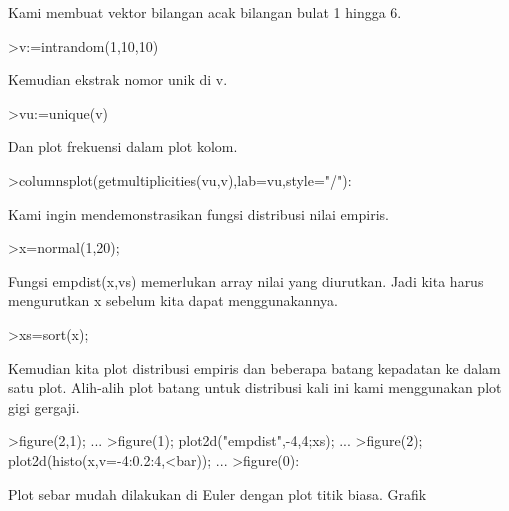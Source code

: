 \documentclass[a4paper,10pt]{article}
\begin{document}
\begin{eulernotebook}
\begin{eulercomment}
\begin{eulercomment}
\begin{eulercomment}
Kami membuat vektor bilangan acak bilangan bulat 1 hingga 6.
\end{eulercomment}
\begin{eulerprompt}
>v:=intrandom(1,10,10)
\end{eulerprompt}
\begin{euleroutput}
  [3,  2,  6,  10,  4,  1,  5,  3,  6,  7]
\end{euleroutput}
\begin{eulercomment}
Kemudian ekstrak nomor unik di v.
\end{eulercomment}
\begin{eulerprompt}
>vu:=unique(v)
\end{eulerprompt}
\begin{euleroutput}
  [1,  2,  3,  4,  5,  6,  7,  10]
\end{euleroutput}
\begin{eulercomment}
Dan plot frekuensi dalam plot kolom.
\end{eulercomment}
\begin{eulerprompt}
>columnsplot(getmultiplicities(vu,v),lab=vu,style="/"):
\end{eulerprompt}
\begin{eulercomment}
Kami ingin mendemonstrasikan fungsi distribusi nilai empiris.
\end{eulercomment}
\begin{eulerprompt}
>x=normal(1,20);
\end{eulerprompt}
\begin{eulercomment}
Fungsi empdist(x,vs) memerlukan array nilai yang diurutkan. Jadi kita
harus mengurutkan x sebelum kita dapat menggunakannya.
\end{eulercomment}
\begin{eulerprompt}
>xs=sort(x);
\end{eulerprompt}
\begin{eulercomment}
Kemudian kita plot distribusi empiris dan beberapa batang kepadatan ke
dalam satu plot. Alih-alih plot batang untuk distribusi kali ini kami
menggunakan plot gigi gergaji.
\end{eulercomment}
\begin{eulerprompt}
>figure(2,1); ...
>figure(1); plot2d("empdist",-4,4;xs); ...
>figure(2); plot2d(histo(x,v=-4:0.2:4,<bar));  ...
>figure(0):
\end{eulerprompt}
\begin{eulercomment}
Plot sebar mudah dilakukan di Euler dengan plot titik biasa. Grafik

\end{eulercomment}
\end{eulercomment}
\end{eulercomment}
\end{eulernotebook}
\end{document}
